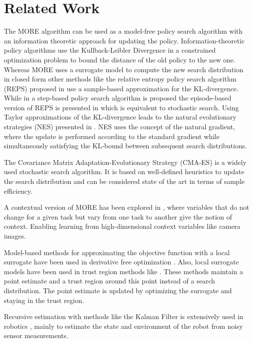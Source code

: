 
\chapter{Related Work}
The MORE algorithm can be used as a model-free policy
search algorithm with an information theoretic approach for
updating the policy.
Information-theoretic policy algorithms use
the Kullback-Leibler Divergence in a constrained optimization problem
to bound the distance of the old policy to the new one.
Whereas MORE uses a surrogate model to compute the new search distribution
in closed form other methods like
the relative entropy policy search algorithm (REPS)
proposed in \citet{peters2010relative} use a
sample-based approximation for the KL-divergence. While in
\citet{peters2010relative} a step-based policy search
algorithm is proposed the episode-based
version of REPS is presented in \citet{kupcsik2013data} which is equivalent
to stochastic search.
Using Taylor approximations of the KL-divergence leads to the
natural evolutionary strategies (NES)
presented in \citet{wierstra2014natural}. 
NES uses the concept of the natural gradient, where the update is performed
according to the standard gradient while simultaneously satisfying the
KL-bound between subsequent search distributions.

The Covariance Matrix Adaptation-Evolutionary Strategy (CMA-ES)
\citep{hansen2016cma}
is a widely used stochastic search algorithm. It is based on
well-defined heuristics to update the search distribution and
can be considered state of the art in terms of sample efficiency.

A contextual version of MORE has been
explored in \citet{tangkaratt2017policy}, where
variables that do not change for a given task
but vary from one task to another
give the notion of context. Enabling
learning from high-dimensional
context variables like camera images.

Model-based methods for approximating the objective function
with a local surrogate have been used in
derivative free optimization \citet{nocedal2006numerical}.
Also, local surrogate models have been used in trust region
methods like \citet{powell2009bobyqa}.
These methods maintain a point estimate
and a trust region around this point instead
of a search distribution. The point estimate is updated by optimizing
the surrogate and staying in the trust region.

Recursive estimation with methods like
the Kalman Filter is extensively used in robotics \citep{chen2011kalman},
mainly to estimate the state and environment of the robot
from noisy sensor measurements.


